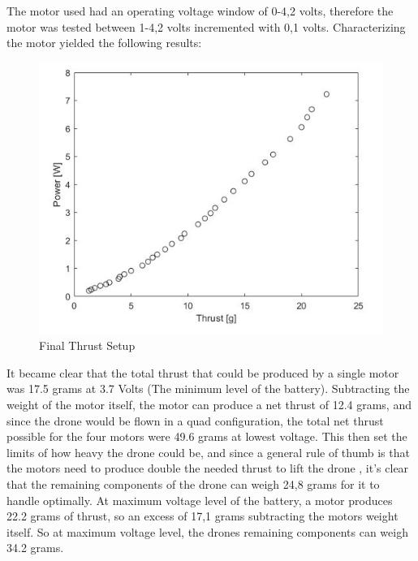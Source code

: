 The motor used had an operating voltage window of 0-4,2 volts, therefore the motor was tested between 1-4,2 volts incremented with 0,1 volts. 
Characterizing the motor yielded the following results:

\begin{figure}
    \includegraphics[width=\linewidth]{pictures/control/Graph Thrust.jpg}
    \caption{Final Thrust Setup}
    \label{fig:Final Thrust Setup}

\end{figure}

It became clear that the total thrust that could be produced by a single motor was 17.5 grams at 3.7 Volts 
(The minimum level of the battery). Subtracting the weight of the motor itself, the motor can produce a net thrust of 12.4 grams, 
and since the drone would be flown in a quad configuration, the total net thrust possible for the four motors were 49.6 grams at lowest voltage. 
This then set the limits of how heavy the drone could be, and since a general rule of thumb is that the motors need to produce double the needed thrust to lift the drone , 
it’s clear that the remaining components of the drone can weigh 24,8 grams for it to handle optimally. At maximum voltage level of the battery, a motor produces 22.2 grams of thrust, 
so an excess of 17,1 grams subtracting the motors weight itself. So at maximum voltage level, the drones remaining components can weigh 34.2 grams.  



